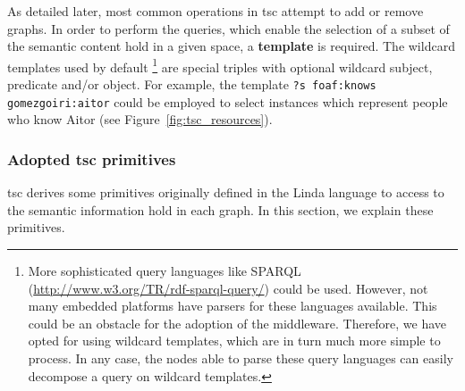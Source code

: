 As detailed later, most common operations in \ac{tsc} attempt to add or remove graphs.
In order to perform the queries, which enable the selection of a subset of the semantic content hold in a given space, a \textbf{template} is required.
The wildcard templates used by default
\footnote{
  More sophisticated query languages like SPARQL (\url{http://www.w3.org/TR/rdf-sparql-query/}) could be used. %
  However, not many embedded platforms have parsers for these languages available.
  This could be an obstacle for the adoption of the middleware.
  Therefore, we have opted for using wildcard templates, which are in turn much more simple to process.
  In any case, the nodes able to parse these query languages can easily decompose a query on wildcard templates.
}
are special triples with optional wildcard subject, predicate and/or object.
For example, the template \texttt{?s foaf:knows gomezgoiri:aitor} could be employed to select instances which represent people who know Aitor (see Figure~\ref{fig:tsc_resources}).




\subsubsection{Adopted \acs{tsc} primitives}
\label{sec:primitives}

\acs{tsc} derives some primitives originally defined in the Linda language \citep{gelernter_generative_1985} to access to the semantic information hold in each graph.
In this section, we explain these primitives.

